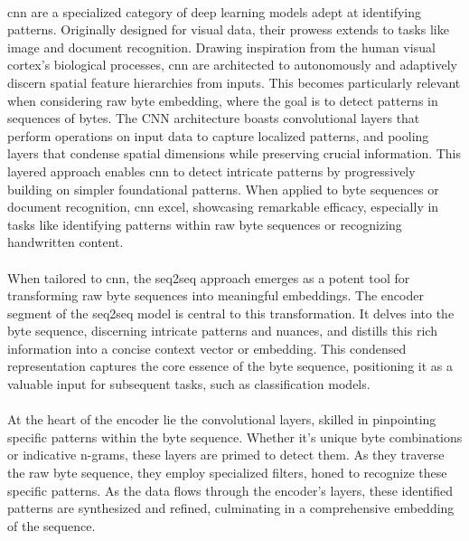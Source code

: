         \paragraph{}\acrfull{cnn}\cite{lecun_gradient-based_1998} are a specialized category of deep learning models adept at identifying patterns. Originally designed for visual data, their prowess extends to tasks like image and document recognition. Drawing inspiration from the human visual cortex's biological processes, \acrshort{cnn} are architected to autonomously and adaptively discern spatial feature hierarchies from inputs. This becomes particularly relevant when considering raw byte embedding, where the goal is to detect patterns in sequences of bytes. The CNN architecture boasts convolutional layers that perform operations on input data to capture localized patterns, and pooling layers that condense spatial dimensions while preserving crucial information. This layered approach enables \acrshort{cnn} to detect intricate patterns by progressively building on simpler foundational patterns. When applied to byte sequences or document recognition, \acrshort{cnn} excel, showcasing remarkable efficacy, especially in tasks like identifying patterns within raw byte sequences or recognizing handwritten content.

        \paragraph{}When tailored to \acrshort{cnn}, the \acrfull{seq2seq}\cite{gehring_convolutional_2017} approach emerges as a potent tool for transforming raw byte sequences into meaningful embeddings. The encoder segment of the \acrshort{seq2seq} model is central to this transformation. It delves into the byte sequence, discerning intricate patterns and nuances, and distills this rich information into a concise context vector or embedding. This condensed representation captures the core essence of the byte sequence, positioning it as a valuable input for subsequent tasks, such as classification models.

        \paragraph{}At the heart of the encoder lie the convolutional layers, skilled in pinpointing specific patterns within the byte sequence. Whether it's unique byte combinations or indicative n-grams, these layers are primed to detect them. As they traverse the raw byte sequence, they employ specialized filters, honed to recognize these specific patterns. As the data flows through the encoder's layers, these identified patterns are synthesized and refined, culminating in a comprehensive embedding of the sequence.

